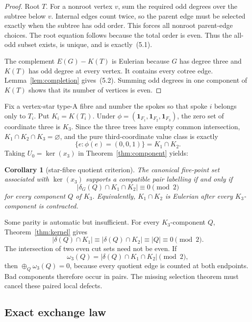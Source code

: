 \documentclass[11pt]{article}
\newtheorem{corollary}[theorem]{Corollary}
\theoremstyle{definition}
\theoremstyle{remark}
\newcommand{\1}{\mathbf 1}
\newcommand{\xor}{\mathbin{\oplus}}
\begin{document}
\begin{proof}
Root \(T\).  For a nonroot vertex \(v\), sum the required odd degrees over
the subtree below \(v\).  Internal edges count twice, so the parent edge
must be selected exactly when the subtree has odd order.  This forces all
nonroot parent-edge choices.  The root equation follows because the total
order is even.  Thus the all-odd subset exists, is unique, and is
exactly~(5.1).

The complement \(E(G)-K(T)\) is Eulerian because \(G\) has degree three
and \(K(T)\) has odd degree at every vertex.  It contains every cotree
edge.  Lemma~\ref{lem:completion} gives~(5.2).  Summing odd degrees in one
component of \(K(T)\) shows that its number of vertices is even.
\end{proof}

Fix a vertex-star type-A fibre and number the spokes so that spoke \(i\)
belongs only to \(T_i\).  Put \(K_i=K(T_i)\).  Under
\(\phi=(\1_{F_1},\1_{F_2},\1_{F_3})\), the zero set of coordinate three is
\(K_3\).  Since the three trees have empty common intersection,
\(K_1\cap K_2\cap K_3=\varnothing\), and the pure third-coordinate value
class is exactly
\[
 \{e:\phi(e)=(0,0,1)\}=K_1\cap K_2.                       \tag{5.3}
\]
Taking \(U_0=\ker(x_3)\) in Theorem~\ref{thm:component} yields:

\begin{corollary}[star-fibre quotient criterion]\label{cor:quotient}
The canonical five-point set associated with \(\ker(x_3)\) supports a
compatible pair labelling if and only if
\[
 |\delta_G(Q)\cap K_1\cap K_2|\equiv0\pmod2               \tag{5.4}
\]
for every component \(Q\) of \(K_3\).  Equivalently,
\(K_1\cap K_2\) is Eulerian after every \(K_3\)-component is contracted.
\end{corollary}

Some parity is automatic but insufficient.  For every \(K_3\)-component
\(Q\), Theorem~\ref{thm:kernel} gives
\[
 |\delta(Q)\cap K_1|\equiv|\delta(Q)\cap K_2|
 \equiv |Q|\equiv0\pmod2.                                \tag{5.5}
\]
The intersection of two even cut sets need not be even.  If
\[
 \omega_3(Q)=|\delta(Q)\cap K_1\cap K_2|\pmod2,
\]
then \(\xor_Q\omega_3(Q)=0\), because every quotient edge is counted at
both endpoints.  Bad components therefore occur in pairs.  The missing
selection theorem must cancel these paired local defects.

\subsection{Exact exchange law}
\end{document}
